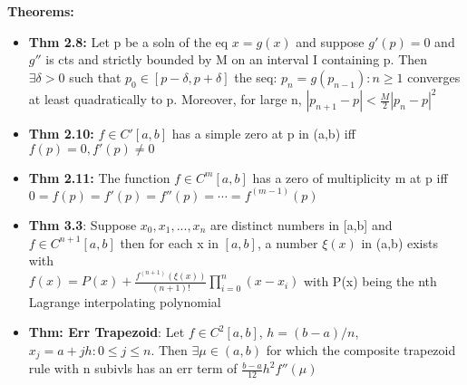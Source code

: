 \documentclass{article}
\begin{document}
\begin{minipage}[t]{0.49\textwidth}
\textbf{Theorems:}
\begin{itemize}
  \item {\textbf{Thm 2.8:} Let p be a soln of the eq $x=g(x)$ and suppose $g'(p)=0$ and $g''$ is cts and strictly bounded by M on an interval I containing p. Then $\exists \delta > 0$ such that $p_0\in[p-\delta, p+\delta]$ the seq: $p_n=g(p_{n-1}): n\ge1$ converges at least quadratically to p. Moreover, for large n, $|p_{n+1}-p|<\frac{M}{2}|p_n-p|^2$ }
  \item {\textbf{Thm 2.10:} $f\in C'[a,b]$ has a simple zero at p in (a,b) iff $f(p)=0,f'(p)\ne0$ }
  \item {\textbf{Thm 2.11:} The function $f\in C^m[a,b]$ has a zero of multiplicity m at p iff $0=f(p)=f'(p)=f''(p)=\cdots=f^{(m-1)}(p)$ }
  \item {\textbf{Thm 3.3}: Suppose $x_0,x_1,...,x_n$ are distinct numbers in [a,b] and $f\in C^{n+1}[a,b]$ then for each x in $[a,b]$, a number $\xi(x)$ in (a,b) exists with}\\
  $f(x)=P(x)+\frac{f^{(n+1)}(\xi(x))}{(n+1)!}\prod_{i=0}^{n}(x-x_i)$
  with P(x) being the nth Lagrange interpolating polynomial
  \item {\textbf{Thm: Err Trapezoid}: Let $f\in C^2[a,b]$, $h=(b-a)/n$, $x_j=a+jh:0\le j\le n$. Then $\exists\mu\in(a,b)$ for which the composite trapezoid rule with n subivls has an err term of $\frac{b-a}{12}h^2f''(\mu)$}
\end{itemize}


\end{minipage}
\end{document}
